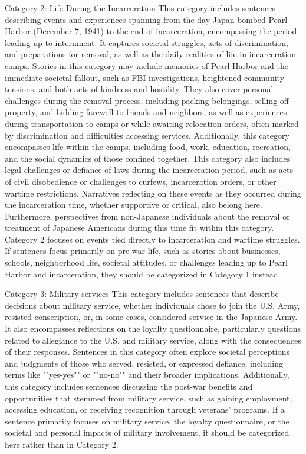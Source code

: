 Category 2: Life During the Incarceration 
This category includes sentences describing events and experiences spanning from the day Japan bombed Pearl Harbor (December 7, 1941) to the end of incarceration, encompassing the period leading up to internment. It captures societal struggles, acts of discrimination, and preparations for removal, as well as the daily realities of life in incarceration camps. Stories in this category may include memories of Pearl Harbor and the immediate societal fallout, such as FBI investigations, heightened community tensions, and both acts of kindness and hostility. They also cover personal challenges during the removal process, including packing belongings, selling off property, and bidding farewell to friends and neighbors, as well as experiences during transportation to camps or while awaiting relocation orders, often marked by discrimination and difficulties accessing services. Additionally, this category encompasses life within the camps, including food, work, education, recreation, and the social dynamics of those confined together.
This category also includes legal challenges or defiance of laws during the incarceration period, such as acts of civil disobedience or challenges to curfews, incarceration orders, or other wartime restrictions. Narratives reflecting on these events as they occurred during the incarceration time, whether supportive or critical, also belong here. Furthermore, perspectives from non-Japanese individuals about the removal or treatment of Japanese Americans during this time fit within this category.
Category 2 focuses on events tied directly to incarceration and wartime struggles. If sentences focus primarily on pre-war life, such as stories about businesses, schools, neighborhood life, societal attitudes, or challenges leading up to Pearl Harbor and incarceration, they should be categorized in Category 1 instead. 

Category 3: Military services 
This category includes sentences that describe decisions about military service, whether individuals chose to join the U.S. Army, resisted conscription, or, in some cases, considered service in the Japanese Army. It also encompasses reflections on the loyalty questionnaire, particularly questions related to allegiance to the U.S. and military service, along with the consequences of their responses. Sentences in this category often explore societal perceptions and judgments of those who served, resisted, or expressed defiance, including terms like ""yes-yes"" or ""no-no"" and their broader implications.
Additionally, this category includes sentences discussing the post-war benefits and opportunities that stemmed from military service, such as gaining employment, accessing education, or receiving recognition through veterans' programs. If a sentence primarily focuses on military service, the loyalty questionnaire, or the societal and personal impacts of military involvement, it should be categorized here rather than in Category 2.

